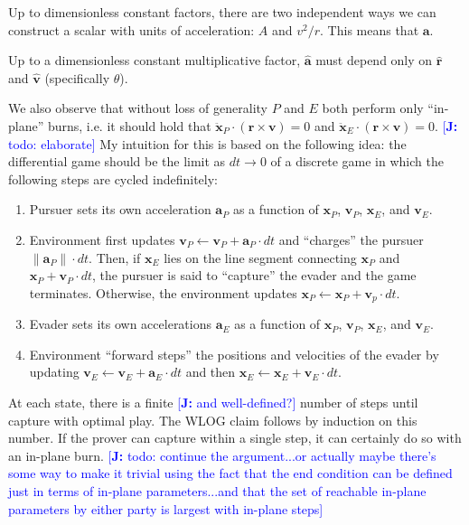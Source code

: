 \documentclass{article}
\newcommand{\authnote}[3]{\textcolor{#3}{[{\footnotesize {\bf #1:} { {#2}}}]}}
\newcommand{\jnote}[1]{\authnote{J}{#1}{blue} }
\renewcommand{\vec}[1]{\mathbf{#1}}
\begin{document}
Up to dimensionless constant factors, there are two independent ways we can
construct a scalar with units of acceleration: $A$ and $v^2 / r$.  This means
that $\vec{a}$.

Up to a dimensionless constant multiplicative factor, $\hat{\vec{a}}$
must depend only on $\hat{\vec{r}}$ and $\hat{\vec{v}}$ (specifically $\theta$).


We also observe that without loss of generality $P$ and $E$ both perform
only ``in-plane'' burns, i.e. it should hold that $\ddot{\vec{x}}_P \cdot (\vec{r} \times \vec{v})
= 0$ and $\ddot{\vec{x}}_E \cdot ( \vec{r} \times \vec{v}) = 0$.  \jnote{todo:
  elaborate}
My intuition for this is based on the following idea: the
  differential game should be the limit as $dt \to 0$ of a discrete game in which the
  following steps are cycled indefinitely:
  \begin{enumerate}
  \item Pursuer sets its own acceleration $\vec{a}_P$ as a function of
    $\vec{x}_P$, $\vec{v}_P$, $\vec{x}_E$, and $\vec{v}_E$.
  \item Environment first updates
    $\vec{v}_P \gets \vec{v}_P + \vec{a}_P \cdot dt$ and ``charges'' the pursuer
    $\| \vec{a}_P \| \cdot dt$.  Then, if $\vec{x}_E$ lies on the line segment
    connecting $\vec{x}_P$ and $\vec{x}_P + \vec{v}_P \cdot dt$, the pursuer is
    said to ``capture'' the evader and the game terminates.  Otherwise, the
    environment updates $\vec{x}_P \gets \vec{x}_P + \vec{v}_p \cdot dt$.
  \item Evader sets its own accelerations $\vec{a}_E$ as a function of
    $\vec{x}_P$, $\vec{v}_P$, $\vec{x}_E$, and $\vec{v}_E$.
  \item Environment ``forward steps'' the positions and velocities of the evader
    by updating
    $\vec{v}_E \gets \vec{v}_E + \vec{a}_E \cdot dt$ and then
    $\vec{x}_E \gets \vec{x}_E + \vec{v}_E \cdot dt$.
  \end{enumerate}

  At each state, there is a finite \jnote{and well-defined?} number of steps until capture with
  optimal play.  The WLOG claim follows by induction on this number.  If the
  prover can capture within a single step, it can certainly do so with an
  in-plane burn.  \jnote{todo: continue the argument...or actually maybe there's
  some way to make it trivial using the fact that the end condition can be
  defined just in terms of in-plane parameters...and that the set of reachable
  in-plane parameters by either party is largest with in-plane steps}
\end{document}
